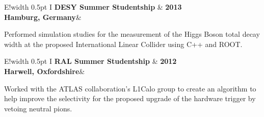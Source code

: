 \documentclass[11pt,a4paper]{article}
\newcommand\VRule{\color{lightgray}\vrule width 0.5pt}
\begin{document}
\noindent\begin{tabular}{E!{\VRule} I }
{\bf DESY Summer Studentship}   & {\bf 2013}\\
{\bf Hamburg, Germany}&\\
\end{tabular}

Performed simulation studies for the measurement of the Higgs Boson total decay width at the proposed International Linear Collider using C++ and ROOT. \\


\noindent\begin{tabular}{E!{\VRule} I }
{\bf RAL Summer Studentship}   & {\bf 2012 }\\
{\bf Harwell, Oxfordshire}&\\[5pt]
\end{tabular}
Worked with the ATLAS collaboration's L1Calo group to create an algorithm to help improve the selectivity for the proposed upgrade of the hardware trigger by vetoing neutral pions.\\
\end{document}
